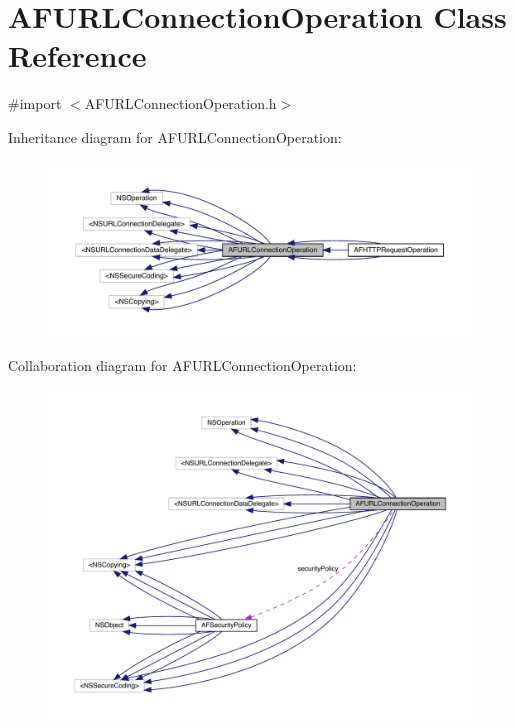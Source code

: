 \hypertarget{interface_a_f_u_r_l_connection_operation}{}\section{A\+F\+U\+R\+L\+Connection\+Operation Class Reference}
\label{interface_a_f_u_r_l_connection_operation}


{\ttfamily \#import $<$A\+F\+U\+R\+L\+Connection\+Operation.\+h$>$}



Inheritance diagram for A\+F\+U\+R\+L\+Connection\+Operation\+:\nopagebreak
\begin{figure}[H]
\begin{center}
\leavevmode
\includegraphics[width=350pt]{interface_a_f_u_r_l_connection_operation__inherit__graph}
\end{center}
\end{figure}


Collaboration diagram for A\+F\+U\+R\+L\+Connection\+Operation\+:\nopagebreak
\begin{figure}[H]
\begin{center}
\leavevmode
\includegraphics[width=350pt]{interface_a_f_u_r_l_connection_operation__coll__graph}
\end{center}
\end{figure}
